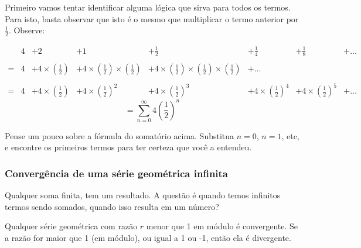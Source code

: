 \documentclass[a4paper]{article}
\begin{document}
Primeiro vamos tentar identificar alguma lógica que sirva para todos
os termos. Para isto, basta observar que isto é o mesmo que
multiplicar o termo anterior por $\frac{1}{2}$. Observe:


\begin{displaymath}
  \begin{array}{rccccccc}
    &4&+2&+1&+\frac{1}{2}&+\frac{1}{4}&+\frac{1}{8}&+\ldots\\
    &&&&&&&\\
    =&4& + 4\times\left(\frac{1}{2}\right)&+4\times\left(\frac{1}{2}\right)\times\left(\frac{1}{2}\right)&+4\times\left(\frac{1}{2}\right)\times\left(\frac{1}{2}\right)\times\left(\frac{1}{2}\right)& + \ldots& & \\
    &&&&&&&\\
    =&4& +4\times\left(\frac{1}{2}\right)&+4\times\left(\frac{1}{2}\right)^2&+4\times\left(\frac{1}{2}\right)^3&+4\times\left(\frac{1}{2}\right)^4&+4\times\left(\frac{1}{2}\right)^5&+\ldots
  \end{array}
\end{displaymath}
\begin{displaymath}
    = \sum_{n=0}^\infty 4\left(\frac{1}{2}\right)^n
\end{displaymath}

Pense um pouco sobre a fórmula do somatório acima. Substitua $n=0$,
$n=1$, etc, e encontre os primeiros termos para ter certeza que você a
entendeu.

\subsubsection{Convergência de uma série geométrica infinita}

Qualquer soma finita, tem um resultado. A questão é quando temos
infinitos termos sendo somados, quando isso resulta em um número?

Qualquer série geométrica com razão $r$ menor que 1 em módulo é
convergente. Se a razão for maior que 1 (em módulo), ou igual a 1 ou
-1, então ela é divergente.
\end{document}

